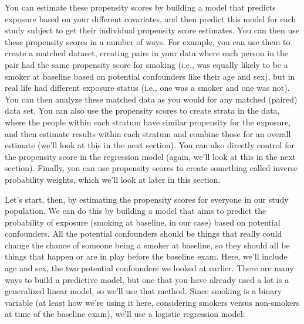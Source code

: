 \documentclass[
]{book}
\newenvironment{Shaded}{\begin{snugshade}}{\end{snugshade}}
\newcommand{\DataTypeTok}[1]{\textcolor[rgb]{0.13,0.29,0.53}{#1}}
\newcommand{\KeywordTok}[1]{\textcolor[rgb]{0.13,0.29,0.53}{\textbf{#1}}}
\newcommand{\NormalTok}[1]{#1}
\newcommand{\OperatorTok}[1]{\textcolor[rgb]{0.81,0.36,0.00}{\textbf{#1}}}
\newcommand{\StringTok}[1]{\textcolor[rgb]{0.31,0.60,0.02}{#1}}
\begin{document}
You can estimate these propensity scores by building a model that predicts exposure based on your different covariates, and then predict this model for each study subject to get their individual propensity score estimates. You can then use these propensity scores in a number of ways. For example, you can use them to create a matched dataset, creating pairs in your data where each person in the pair had the same propensity score for smoking (i.e., was equally likely to be a smoker at baseline based on potential confounders like their age and sex), but in real life had different exposure status (i.e., one was a smoker and one was not). You can then analyze these matched data as you would for any matched (paired) data set. You can also use the propensity scores to create strata in the data, where the people within each stratum have similar propensity for the exposure, and then estimate results within each stratum and combine those for an overall estimate (we'll look at this in the next section). You can also directly control for the propensity score in the regression model (again, we'll look at this in the next section). Finally, you can use propensity scores to create something called inverse probability weights, which we'll look at later in this section.

Let's start, then, by estimating the propensity scores for everyone in our study population. We can do this by building a model that aims to predict the probability of exposure (smoking at baseline, in our case) based on potential confounders. All the potential confounders should be things that really could change the chance of someone being a smoker at baseline, so they should all be things that happen or are in play before the baseline exam. Here, we'll include age and sex, the two potential confounders we looked at earlier. There are many ways to build a predictive model, but one that you have already used a lot is a generalized linear model, so we'll use that method. Since smoking is a binary variable (at least how we're using it here, considering smokers versus non-smokers at time of the baseline exam), we'll use a logistic regression model:

\begin{Shaded}
\end{Shaded}
\end{document}
